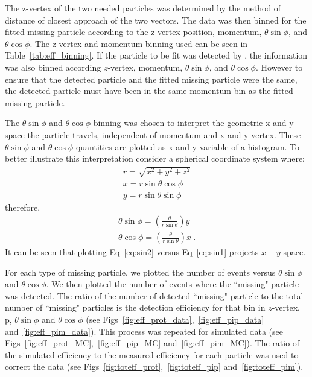 The z-vertex of the two needed particles was determined by the method of distance of closest approach of the two vectors. The data was then binned for the fitted missing particle according to the z-vertex position, momentum, $\theta \sin\phi$, and $\theta \cos\phi$. The z-vertex and momentum binning used can be seen in Table~\ref{tab:eff_binning}. If the particle to be fit was detected by , the information was also binned according $z$-vertex, momentum, $\theta \sin\phi$, and $\theta \cos\phi$. However to ensure that the detected particle and the fitted missing particle were the same, the detected particle must have been in the same momentum bin as the fitted missing particle.

The $\theta \sin\phi$ and $\theta \cos\phi$ binning was chosen to interpret the geometric x and y space the particle travels, independent of momentum and x and y vertex. These $\theta \sin\phi$ and $\theta \cos\phi$ quantities are plotted as x and y variable of a histogram. To better illustrate this interpretation consider a spherical coordinate system where;
\begin{align}
r=\sqrt{x^2 + y^2 + z^2} \\
x = r\sin\theta\cos\phi \\
y = r\sin\theta\sin\phi
\end{align}
therefore,
\begin{align}
\theta \sin\phi = \left(\frac{\theta}{r\sin\theta}\right)y \label{eq:sin1} \\
\theta \cos\phi = \left(\frac{\theta}{r\sin\theta}\right)x \label{eq:sin2} \ .
\end{align}
It can be seen that plotting Eq~\ref{eq:sin2} versus Eq~\ref{eq:sin1} projects $x-y$ space.

For each type of missing particle, we plotted the number of events versus $\theta \sin\phi$ and $\theta \cos\phi$. We then plotted the number of events where the ``missing" particle was detected. The ratio of the number of detected ``missing" particle to the total number of ``missing" particles is the detection efficiency for that bin in $z$-vertex, p, $\theta \sin\phi$ and $\theta \cos\phi$ (see Figs~\ref{fig:eff_prot_data},~\ref{fig:eff_pip_data} and~\ref{fig:eff_pim_data}). This process was repeated for simulated data (see Figs~\ref{fig:eff_prot_MC},~\ref{fig:eff_pip_MC} and~\ref{fig:eff_pim_MC}). The ratio of the simulated efficiency to the measured efficiency for each particle was used to correct the data (see Figs~\ref{fig:toteff_prot},~\ref{fig:toteff_pip} and~\ref{fig:toteff_pim}).
\FloatBarrier
